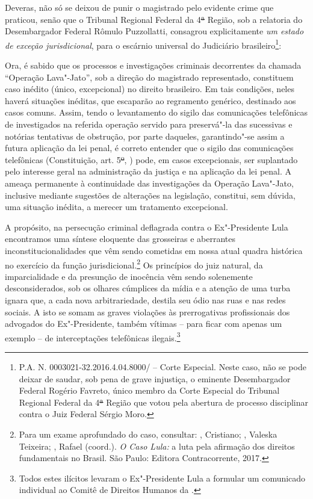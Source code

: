 Deveras, não só se deixou de punir o magistrado pelo evidente crime que
praticou, senão que o Tribunal Regional Federal da 4\sout{ª} Região, sob
a relatoria do Desembargador Federal Rômulo Puzzollatti, consagrou
explicitamente \emph{um estado de exceção jurisdicional}, para o
escárnio universal do Judiciário brasileiro\footnote{P.A. N.
  0003021-32.2016.4.04.8000/ -- Corte Especial. Neste caso, não se
  pode deixar de saudar, sob pena de grave injustiça, o eminente
  Desembargador Federal Rogério Favreto, único membro da Corte Especial
  do Tribunal Regional Federal da 4\sout{ª} Região que votou pela
  abertura de processo disciplinar contra o Juiz Federal Sérgio Moro.}:

Ora, é sabido que os processos e investigações criminais decorrentes da
chamada ``Operação Lava"-Jato'', sob a direção do magistrado
representado, constituem caso inédito (único, excepcional) no direito
brasileiro. Em tais condições, neles haverá situações inéditas, que
escaparão ao regramento genérico, destinado aos casos comuns. Assim,
tendo o levantamento do sigilo das comunicações telefônicas de
investigados na referida operação servido para preservá"-la das
sucessivas e notórias tentativas de obstrução, por parte daqueles,
garantindo"-se assim a futura aplicação da lei penal, é correto entender
que o sigilo das comunicações telefônicas (Constituição, art. 5\sout{º},
) pode, em casos excepcionais, ser suplantado pelo interesse geral na
administração da justiça e na aplicação da lei penal. A ameaça
permanente à continuidade das investigações da Operação Lava"-Jato,
inclusive mediante sugestões de alterações na legislação, constitui, sem
dúvida, uma situação inédita, a merecer um tratamento excepcional.

A propósito, na persecução criminal deflagrada contra o Ex"-Presidente
Lula encontramos uma síntese eloquente das grosseiras e aberrantes
inconstitucionalidades que vêm sendo cometidas em nossa atual quadra
histórica no exercício da função jurisdicional.\footnote{Para um exame
  aprofundado do caso, consultar:  , Cristiano; 
  , Valeska Teixeira; , Rafael (coord.). \emph{O Caso Lula:}
  a luta pela afirmação dos direitos fundamentais no Brasil. São Paulo:
  Editora Contracorrente, 2017.} Os princípios do juiz natural, da
imparcialidade e da presunção de inocência vêm sendo solenemente
desconsiderados, sob os olhares cúmplices da mídia e a atenção de uma
turba ignara que, a cada nova arbitrariedade, destila seu ódio nas ruas
e nas redes sociais. A isto se somam as graves violações às
prerrogativas profissionais dos advogados do Ex"-Presidente, também
vítimas -- para ficar com apenas um exemplo -- de interceptações
telefônicas ilegais.\footnote{Todos estes ilícitos levaram o
  Ex"-Presidente Lula a formular um comunicado individual ao Comitê de
  Direitos Humanos da .}

